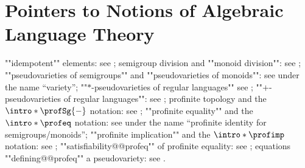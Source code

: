 \section{Pointers to Notions of Algebraic Language Theory}
\label{apdx:pointers-pin}

\begin{itemize}
	\itemAP ""idempotent"" elements:
		see \cite[\S II.1.2, p.~14]{Pin2022MathematicalFoundations};
	\itemAP semigroup division and ""monoid division"":
		see \cite[\S II.3.3, p.~21]{Pin2022MathematicalFoundations};
	\itemAP ""pseudovarieties of semigroups"" and ""pseudovarieties of monoids"":
		see \cite[\S XI.1, p.~189]{Pin2022MathematicalFoundations} under the name ``variety'';
	\itemAP ""$\ast $-pseudovarieties of regular languages""
		see \cite[\S XIII.3, p.~226]{Pin2022MathematicalFoundations};
	\itemAP ""$+$-pseudovarieties of regular languages"":
		see \cite[\S XIII.4, ``Eilenberg’s $+$-varieties'', p.~229]{Pin2022MathematicalFoundations};
	\itemAP profinite topology and the $\intro*\profSg{-}$ notation:
		see \cite[\S X.2, p.~178]{Pin2022MathematicalFoundations};
	\itemAP ""profinite equality"" and the $\intro*\profeq$ notation:
		see \cite[\S XI.3, p.~193]{Pin2022MathematicalFoundations} under
		the name ``profinite identity for semigroups/monoids'';
	\itemAP ""profinite implication"" and the $\intro*\profimp$ notation:
		see \cite[\S XIII.1, p.~223]{Pin2022MathematicalFoundations};
	\itemAP ""satisfiability@@profeq"" of profinite equality:
		see \cite[\S XI.3, p.~193]{Pin2022MathematicalFoundations};
	\itemAP equations ""defining@@profeq"" a pseudovariety:
		see \cite[\S XI.3.3, p.~194]{Pin2022MathematicalFoundations}.
\end{itemize}